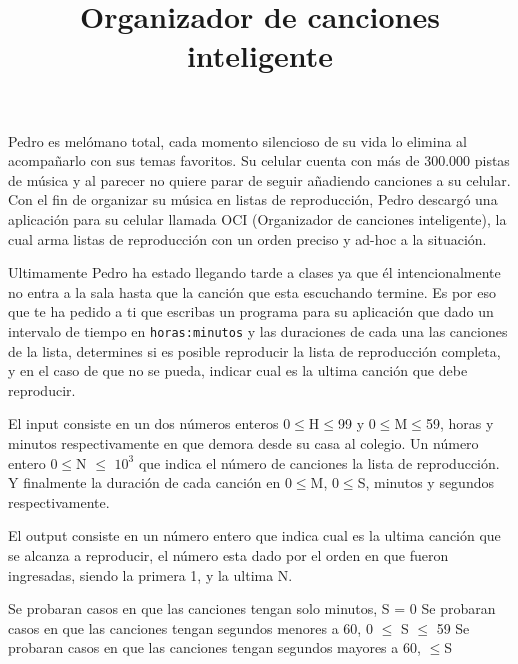 \documentclass{oci}
\title{Organizador de canciones inteligente}
\begin{document}
\begin{problemDescription}
Pedro es melómano total, cada momento silencioso de su vida lo elimina
al acompañarlo con sus temas favoritos. Su celular cuenta con más de
300.000 pistas de música y al parecer no quiere parar de seguir
añadiendo canciones a su celular. Con el fin de organizar su música en
listas de reproducción, Pedro descargó una aplicación para su celular
llamada OCI (Organizador de canciones inteligente), la cual arma listas
de reproducción con un orden preciso y ad-hoc a la situación.

Ultimamente Pedro ha estado llegando tarde a clases ya que él
intencionalmente no entra a la sala hasta que la canción que esta
escuchando termine. Es por eso que te ha pedido a ti que escribas un
programa para su aplicación que dado un intervalo de tiempo en
\texttt{horas:minutos} y las duraciones de cada una las canciones de la
lista, determines si es posible reproducir la lista de reproducción
completa, y en el caso de que no se pueda, indicar cual es la ultima
canción que debe reproducir.
\end{problemDescription}

\begin{inputDescription}
El input consiste en un dos números enteros 0\(\leq\)H\(\leq\)99 y
0\(\leq\)M\(\leq\)59, horas y minutos respectivamente en que demora
desde su casa al colegio. Un número entero 0\(\leq\)N \(\leq\) \(10^3\)
que indica el número de canciones la lista de reproducción. Y finalmente
la duración de cada canción en 0\(\leq\)M,
0\(\leq\)S, minutos y segundos respectivamente.
\end{inputDescription}

\begin{outputDescription}
El output consiste en un número entero que indica cual
es la ultima canción que se alcanza a reproducir, el número esta dado por el
orden en que fueron ingresadas, siendo la primera 1, y la ultima N.
\end{outputDescription}

\begin{scoreDescription}
   Se probaran casos en que las canciones tengan solo minutos, S = 0
   Se probaran casos en que las canciones tengan segundos menores a 60, 0 $\leq$ S $\leq$ 59
   Se probaran casos en que las canciones tengan segundos mayores a 60, $\leq$S
\end{scoreDescription}

\begin{sampleDescription}
\end{sampleDescription}
\end{document}
